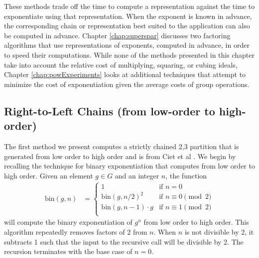 \documentclass{ucalgthes1}
\theoremstyle{definition}
\begin{document}
These methods trade off the time to compute a representation against the time to exponentiate using that representation.  When the exponent is known in advance, the corresponding chain or representation best suited to the application can also be computed in advance.  Chapter \ref{chap:superspar} discusses two factoring algorithms that use representations of exponents, computed in advance, in order to speed their computations.  While none of the methods presented in this chapter take into account the relative cost of multiplying, squaring, or cubing ideals, Chapter \ref{chap:powExperiments} looks at additional techniques that attempt to minimize the cost of exponentiation given the average costs of group operations.  

\subsection{Right-to-Left Chains (from low-order to high-order)}
\label{subsec:rtolChains}

The first method we present computes a strictly chained 2,3 partition that is generated from low order to high order and is from Ciet et al \cite[Figure 8]{Ciet2006}.  We begin by recalling the technique for binary exponentiation that computes from low order to high order.  Given an element $g \in G$ and an integer $n$, the function
\begin{align*}
\textrm{bin}(g, n) &= \begin{cases}
               1 & \textrm{if $n = 0$} \\
               {\textrm{bin}(g, n/2)}^2 & \textrm{if $n \equiv 0 \pmod 2$} \\
               \textrm{bin}(g, n-1) \cdot g & \textrm{if $n \equiv 1 \pmod 2$} \\
	       \end{cases}
\end{align*}
will compute the binary exponentiation of $g^n$ from low order to high order. This algorithm repeatedly removes factors of 2 from $n$.  When $n$ is not divisible by 2, it subtracts 1 such that the input to the recursive call will be divisible by 2.  The recursion terminates with the base case of $n=0$.
\end{document}
